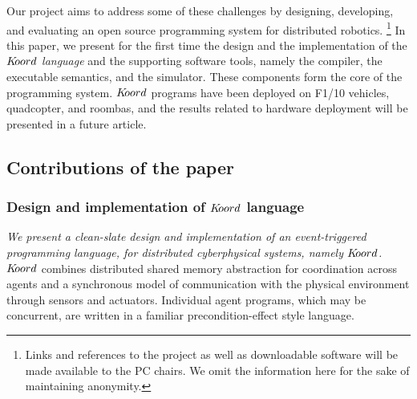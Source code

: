
Our project aims to address some of these challenges by designing, developing, and evaluating an open source programming system for distributed robotics. \footnote{Links and references to the project as well as downloadable software will be made available to the PC chairs. We omit the information here for the sake of maintaining anonymity.} In this paper, we present for the first time the design and the implementation of the {\em $K\kern-2pt oord$ language} and the supporting software tools, namely the compiler, the \K executable semantics, and the simulator. These components form the core of the programming system. $K\kern-2pt oord$ programs have been deployed on F1/10 vehicles, quadcopter, and roombas, and the results related to hardware deployment will be presented in a future article. 





%
%
\subsection{Contributions of the paper}
\subsubsection{Design and implementation of $K\kern-2pt oord$ language}
{\em We present a clean-slate design and implementation of an event-triggered programming language, for distributed cyberphysical systems, namely $K\kern-2pt oord$.} 
%
$K\kern-2pt oord$ combines distributed shared memory abstraction for coordination across agents and a synchronous model of communication with the physical environment through sensors and actuators. Individual agent programs, which may be concurrent, are written in a familiar precondition-effect style language.
%

